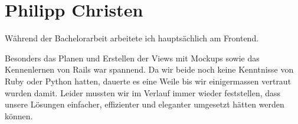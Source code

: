 \section*{Philipp Christen}

Während der Bachelorarbeit arbeitete ich hauptsächlich am Frontend.

Besonders das Planen und Erstellen der Views mit Mockups sowie das Kennenlernen von Rails war spannend. Da wir beide noch keine Kenntnisse von Ruby oder Python hatten, dauerte es eine Weile bis wir einigermassen vertraut wurden damit. Leider mussten wir im Verlauf immer wieder feststellen, dass unsere Lösungen einfacher, effizienter und eleganter umgesetzt hätten werden können.



